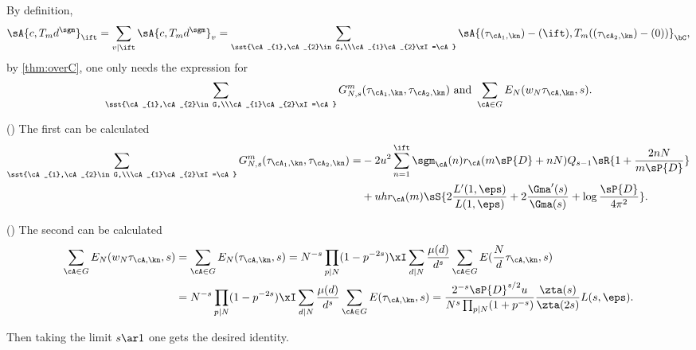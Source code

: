 \documentclass[a4paper, twoside]{article}
\begin{document}
\begin{prf}
	By definition,
	\[
	  \sA{c,T_{m}d^{\sgm}}_{\ift}=\sum_{v\mid\ift}\sA{c,T_{m}d^{\sgm}}_{v}=\sum_{\sst{\cA_{1},\cA_{2}\in G,\\\cA_{1}\cA_{2}\xI=\cA}}\sA{(\tau_{\cA_{1},\kn})-(\ift),T_{m}((\tau_{\cA_{2},\kn})-(0))}_{\bC},
	\]
	by \cref{thm:overC}, one only needs the expression for
	\begin{align*}
	  \sum_{\sst{\cA_{1},\cA_{2}\in G,\\\cA_{1}\cA_{2}\xI=\cA}}G_{N,s}^{m}(\tau_{\cA_{1},\kn},\tau_{\cA_{2},\kn}) \text{ and } \sum_{\cA\in G}E_{N}(w_{N}\tau_{\cA,\kn},s).
	\end{align*}

	(\cite[II.5.8]{GZ1986}) The first can be calculated
	\begin{align*}
	  \sum_{\sst{\cA_{1},\cA_{2}\in G,\\\cA_{1}\cA_{2}\xI=\cA}}G_{N,s}^{m}(\tau_{\cA_{1},\kn},\tau_{\cA_{2},\kn})=&-2u^{2}\sum_{n=1}^{\ift}\sgm_{\cA}(n)r_{\cA}(m\sP{D}+nN)Q_{s-1}\sR{1+\frac{2nN}{m\sP{D}}}\\
	  &+uhr_{\cA}(m)\sS{2\frac{L'(1,\eps)}{L(1,\eps)}+2\frac{\Gma'(s)}{\Gma(s)}+\log{\frac{\sP{D}}{4\pi^{2}}}}.
	\end{align*}

	(\cite[II.4.1]{GZ1986}) The second can be calculated
	\begin{align*}
	  \sum_{\cA\in G}E_{N}(w_{N}\tau_{\cA,\kn},s)&=\sum_{\cA\in G}E_{N}(\tau_{\cA,\kn},s)=N^{-s}\prod_{p\mid N}(1-p^{-2s})\xI\sum_{d\mid N}\frac{\mu(d)}{d^{s}}\sum_{\cA\in G}E(\frac{N}{d}\tau_{\cA,\kn},s) \\
										 &=N^{-s}\prod_{p\mid N}(1-p^{-2s})\xI\sum_{d\mid N}\frac{\mu(d)}{d^{s}}\sum_{\cA\in G}E(\tau_{\cA,\kn},s)=\frac{2^{-s}\sP{D}^{s/2}u}{N^{s}\prod_{p\mid N}(1+p^{-s})}\frac{\zta(s)}{\zta(2s)}L(s,\eps).
	\end{align*}

	Then taking the limit $s\ar1$ one gets the desired identity.


\end{prf}
\end{document}
